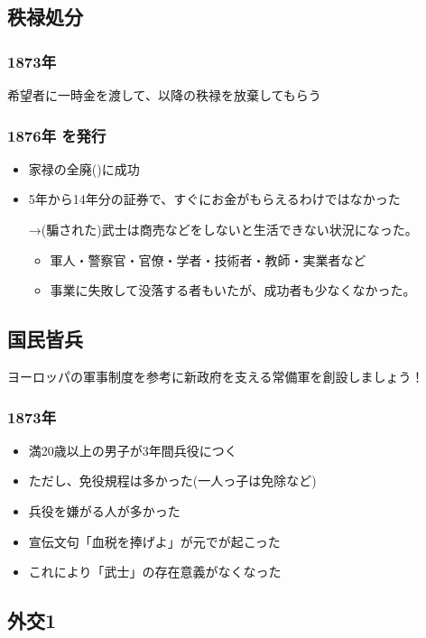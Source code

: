 \documentclass[12pt]{ltjsarticle}
\begin{document}
\subsection{秩禄処分}
\subsubsection*{1873年 }
希望者に一時金を渡して、以降の秩禄を放棄してもらう
\subsubsection*{1876年 を発行}
\begin{itemize}
\item 家禄の全廃()に成功
\item 5年から14年分の証券で、すぐにお金がもらえるわけではなかった

→(騙された)武士は商売などをしないと生活できない状況になった。
\begin{itemize}
\item 軍人・警察官・官僚・学者・技術者・教師・実業者など
\item 事業に失敗して没落する者もいたが、成功者も少なくなかった。
\end{itemize}
\end{itemize}

\subsection{国民皆兵}
ヨーロッパの軍事制度を参考に新政府を支える常備軍を創設しましょう！

\subsubsection*{1873年 }
\begin{itemize}
\item 満20歳以上の男子が3年間兵役につく
\item ただし、免役規程は多かった(一人っ子は免除など)
\item 兵役を嫌がる人が多かった
\item 宣伝文句「血税を捧げよ」が元でが起こった
\item これにより「武士」の存在意義がなくなった
\end{itemize}

\subsection{外交1}
\end{document}
